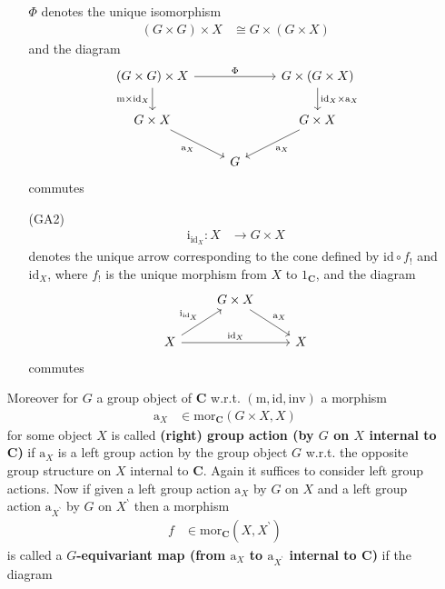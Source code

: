 \begin{exa}
\begin{enumerate}
\begin{enumerate}
$\Phi$ denotes the unique isomorphism
\begin{align*}
  \left(
    G
    \times
    G
  \right)
  \times
  X
  &\cong
  G
  \times
  \left(
    G
    \times
    X
  \right)
\end{align*}
and the diagram
\[
\begin{tikzcd}[sep=normal]
  (G \times G)
  \times
  X
  \arrow{rr}{\Phi}
  \arrow[swap]{d}{\mathrm{m} \times \mathrm{id}_{X}}
  &
  &
  G
  \times
  (G \times X)
  \arrow{d}{\mathrm{id}_{X} \times \mathrm{a}_{X}}
  \\
  G
  \times
  X
  \arrow[swap]{dr}{\mathrm{a}_{X}}
  &
  &
  G
  \times
  X
  \arrow{dl}{\mathrm{a}_{X}}
  \\
  &
  G
  &
\end{tikzcd}
\]
commutes
\item[(GA2)]
\begin{align*}
  \mathrm{i}_{\mathrm{id}_{X}}
  \colon
  X
  &\rightarrow
  G
  \times
  X
\end{align*}
denotes the unique arrow corresponding to the cone defined by $\mathrm{id} \circ f_{!}$ and $\mathrm{id}_{X}$, where $f_{!}$ is the unique morphism from $X$ to $1_{\mathbf{C}}$, and the diagram
\[
\begin{tikzcd}[sep=normal]
  &
  G
  \times
  X
  \arrow{dr}{\mathrm{a}_{X}}
  &
  \\
  X
  \arrow{ur}{\mathrm{i}_{\mathrm{id}_{X}}}
  \arrow{rr}{\mathrm{id}_{X}}
  &
  &
  X
\end{tikzcd}
\]
commutes
\end{enumerate}
Moreover for $G$ a group object of $\mathbf{C}$ w.r.t. $(\mathrm{m},\mathrm{id},\mathrm{inv})$ a morphism
\begin{align*}
  \mathrm{a}_{X}
  &\in
  \mathrm{mor}_{\mathbf{C}}
  \left(
    G
    \times
    X,
    X
  \right)
\end{align*}
for some object $X$ is called \textbf{(right) group action (by $G$ on $X$ internal to $\mathbf{C}$)} if $\mathrm{a}_{X}$ is a left group action by the group object $G$ w.r.t. the opposite group structure on $X$ internal to $\mathbf{C}$. Again it suffices to consider left group actions. Now if given a left group action $\mathrm{a}_{X}$ by $G$ on $X$ and a left group action $\mathrm{a}_{X^{\backprime}}$ by $G$ on $X^{\backprime}$ then a morphism
\begin{align*}
  f
  &\in
  \mathrm{mor}_{\mathbf{C}}
  \left(
    X,
    X^{\backprime}
  \right)
\end{align*}
is called a \textbf{$G$-equivariant map (from $\mathrm{a}_{X}$ to $\mathrm{a}_{X^{\backprime}}$ internal to $\mathbf{C}$)} if the diagram

\end{enumerate}
\end{exa}
